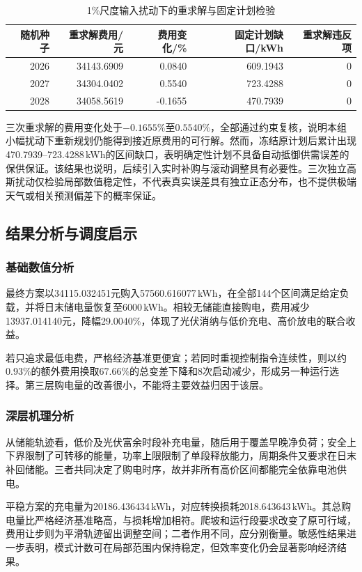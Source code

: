 \documentclass[withoutpreface,bwprint]{cumcmthesis}
\begin{document}
\begin{table}[htbp]
 \centering\small
 \caption{1\%尺度输入扰动下的重求解与固定计划检验}\label{tab:q1-noise}
 \begin{tabular}{rrrrr}
 \toprule
 随机种子&重求解费用/元&费用变化/\%&固定计划缺口/kWh&重求解违反项\\
 \midrule
2026&34143.6909&0.0840&609.1943&0\\
2027&34304.0402&0.5540&723.4288&0\\
2028&34058.5619&-0.1655&470.7939&0\\
 \bottomrule
 \end{tabular}
\end{table}

三次重求解的费用变化处于$-0.1655\%$至$0.5540\%$，全部通过约束复核，说明本组小幅扰动下重新规划仍能得到接近原费用的可行解。然而，冻结原计划后累计出现470.7939--723.4288\,kWh的区间缺口，表明确定性计划不具备自动抵御供需误差的保供保证。该结果也说明，后续引入实时补购与滚动调整具有必要性。三次独立高斯扰动仅检验局部数值稳定性，不代表真实误差具有独立正态分布，也不提供极端天气或相关预测偏差下的概率保证。

\subsection{结果分析与调度启示}
\subsubsection{基础数值分析}
最终方案以34115.032451元购入57560.616077\,kWh，在全部144个区间满足给定负载，并将日末储电量恢复至6000\,kWh。相较无储能直接购电，费用减少13937.014140元，降幅29.0040\%，体现了光伏消纳与低价充电、高价放电的联合收益。

若只追求最低电费，严格经济基准更便宜；若同时重视控制指令连续性，则以约0.93\%的额外费用换取67.66\%的总变差下降和8次启动减少，形成另一种运行选择。第三层购电量的改善很小，不能将主要效益归因于该层。

\subsubsection{深层机理分析}
从储能轨迹看，低价及光伏富余时段补充电量，随后用于覆盖早晚净负荷；安全上下界限制了可转移的能量，功率上限限制了单段释放能力，周期条件又要求在日末补回储能。三者共同决定了购电时序，故并非所有高价区间都能完全依靠电池供电。

平稳方案的充电量为20186.436434\,kWh，对应转换损耗2018.643643\,kWh。其总购电量比严格经济基准略高，与损耗增加相符。爬坡和运行段要求改变了原可行域，费用让步则为平滑轨迹留出调整空间；二者作用不同，应分别衡量。敏感性结果进一步表明，模式计数可在局部范围内保持稳定，但效率变化仍会显著影响经济结果。
\end{document}
